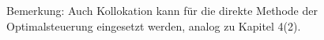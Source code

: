 Bemerkung: Auch Kollokation kann für die direkte Methode der Optimalsteuerung eingesetzt werden, analog zu Kapitel 4(2).























